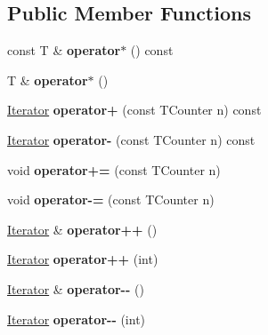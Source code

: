 \subsection*{Public Member Functions}
\begin{DoxyCompactItemize}
\item 
\hypertarget{classIterator_a37682d15d8f14b6cce4a7950c7292867}{}\label{classIterator_a37682d15d8f14b6cce4a7950c7292867} 
const T \& {\bfseries operator$\ast$} () const
\item 
\hypertarget{classIterator_ae25de29205f6cdeefcd32fde37e4d5ca}{}\label{classIterator_ae25de29205f6cdeefcd32fde37e4d5ca} 
T \& {\bfseries operator$\ast$} ()
\item 
\hypertarget{classIterator_a681ddc4b43edb0fd4ca3c49884b77f07}{}\label{classIterator_a681ddc4b43edb0fd4ca3c49884b77f07} 
\hyperlink{classIterator}{Iterator} {\bfseries operator+} (const T\+Counter n) const
\item 
\hypertarget{classIterator_a489b8f3d0a34694a4c6776b6d420b029}{}\label{classIterator_a489b8f3d0a34694a4c6776b6d420b029} 
\hyperlink{classIterator}{Iterator} {\bfseries operator-\/} (const T\+Counter n) const
\item 
\hypertarget{classIterator_a3fa3e09e4060b0e1964aba189529ceac}{}\label{classIterator_a3fa3e09e4060b0e1964aba189529ceac} 
void {\bfseries operator+=} (const T\+Counter n)
\item 
\hypertarget{classIterator_a215fb6135627b9bca788de9192558375}{}\label{classIterator_a215fb6135627b9bca788de9192558375} 
void {\bfseries operator-\/=} (const T\+Counter n)
\item 
\hypertarget{classIterator_a9729d28b9acf45a8998cf0015946402b}{}\label{classIterator_a9729d28b9acf45a8998cf0015946402b} 
\hyperlink{classIterator}{Iterator} \& {\bfseries operator++} ()
\item 
\hypertarget{classIterator_a6d84895dd35fc52c9fbdaea622ed946e}{}\label{classIterator_a6d84895dd35fc52c9fbdaea622ed946e} 
\hyperlink{classIterator}{Iterator} {\bfseries operator++} (int)
\item 
\hypertarget{classIterator_a9e94f8acac03557f80a4c915baeba8fb}{}\label{classIterator_a9e94f8acac03557f80a4c915baeba8fb} 
\hyperlink{classIterator}{Iterator} \& {\bfseries operator-\/-\/} ()
\item 
\hypertarget{classIterator_a7bfadc053058436600ff02029a4287be}{}\label{classIterator_a7bfadc053058436600ff02029a4287be} 
\hyperlink{classIterator}{Iterator} {\bfseries operator-\/-\/} (int)
\item 

\end{DoxyCompactItemize}
